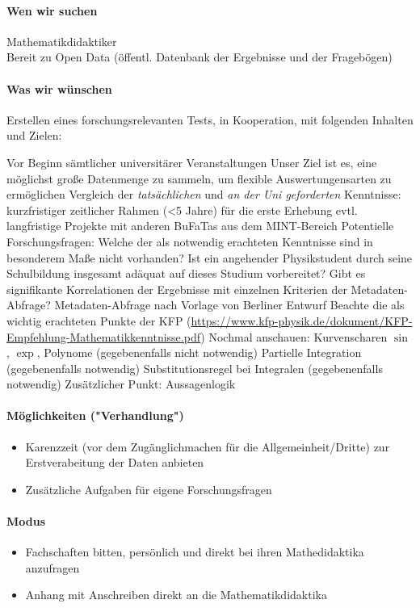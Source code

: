 		\paragraph{Wen wir suchen}
			Mathematikdidaktiker \\
			Bereit zu Open Data (öffentl. Datenbank der Ergebnisse und der Fragebögen)

		\paragraph{Was wir wünschen}
			Erstellen eines forschungsrelevanten Tests, in Kooperation, mit folgenden Inhalten und Zielen:
			\begin{outline}
				\1 Vor Beginn sämtlicher universitärer Veranstaltungen
				\1 Unser Ziel ist es, eine möglichst große Datenmenge zu sammeln, um flexible Auswertungensarten zu ermöglichen
				\1 Vergleich der \textit{tatsächlichen} und \textit{an der Uni geforderten} Kenntnisse:
					\2 kurzfristiger zeitlicher Rahmen (<5 Jahre) für die erste Erhebung
					\2 evtl. langfristige Projekte mit anderen BuFaTas aus dem MINT-Bereich
				\1 Potentielle Forschungsfragen:
					\2 Welche der als notwendig erachteten Kenntnisse sind in besonderem Maße nicht vorhanden?
					\2 Ist ein angehender Physikstudent durch seine Schulbildung insgesamt adäquat auf dieses Studium vorbereitet?
					\2 Gibt es signifikante Korrelationen der Ergebnisse mit einzelnen Kriterien der Metadaten-Abfrage?
				\1 Metadaten-Abfrage nach Vorlage von Berliner Entwurf
				\1 Beachte die als wichtig erachteten Punkte der KFP (\url{https://www.kfp-physik.de/dokument/KFP-Empfehlung-Mathematikkenntnisse.pdf})
				\1 Nochmal anschauen:
					\2 Kurvenscharen $\sin$, $\exp$, Polynome (gegebenenfalls nicht notwendig)
					\2 Partielle Integration (gegebenenfalls notwendig)
					\2 Substitutionsregel bei Integralen (gegebenenfalls notwendig)
				\1 Zusätzlicher Punkt:
					\2 Aussagenlogik
			\end{outline}

		\paragraph{Möglichkeiten ("Verhandlung")}
			\begin{itemize}
				\item Karenzzeit (vor dem Zugänglichmachen für die Allgemeinheit/Dritte) zur Erstverabeitung der Daten anbieten
				\item Zusätzliche Aufgaben für eigene Forschungsfragen
			\end{itemize}

		\paragraph{Modus}
			\begin{itemize}
				\item Fachschaften bitten, persönlich und direkt bei ihren Mathedidaktika anzufragen
				\item Anhang mit Anschreiben direkt an die Mathematikdidaktika
			\end{itemize}
